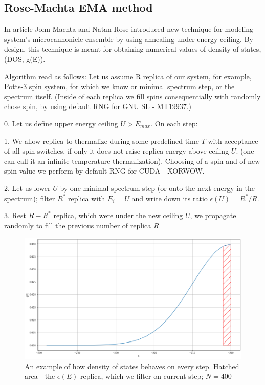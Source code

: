 \documentclass[aps,prl,amssymb,amsmath,twocolumn,floatfix]{revtex4}
\begin{document}
\subsection{Rose-Machta EMA method}

In article \cite{Machta} John Machta and Natan Rose introduced new technique for modeling system's microcannonicle ensemble by using annealing under energy ceiling. By design, this technique is meant for obtaining numerical values of density of states, (DOS, g(E)). 

Algorithm read as follows:
Let us assume R replica of our system, for example, Potts-3 spin system, for which we know or minimal spectrum step, or the spectrum itself. (Inside of each replica we fill spins consequentially with randomly chose spin, by using default RNG for GNU SL - MT19937.)

0. Let us define upper energy ceiling $U > E_{max}$. On each step:

1. We allow replica to thermalize during some predefined time $T$ with acceptance of all spin switches, if only it does not raise replica energy above ceiling $U$. (one can call it an infinite temperature thermalization). Choosing of a spin and of new spin value we perform by default RNG for CUDA - XORWOW.

2. Let us lower $U$ by one minimal spectrum step (or onto the next energy in the spectrum); filter $R^*$ replica with $E_i = U$ and write down its ratio $\epsilon(U) = R^*/R$.

3. Rest $R-R^*$ replica, which were under the new ceiling $U$, we propagate randomly to fill the previous number of replica $R$


\begin{figure}[h!]
	\includegraphics[width=\linewidth]{DOS_slice_picture.png}
	\caption{An example of how density of states behaves on every step. Hatched area - the $\epsilon(E)$ replica, which we filter on current step; $N=400$}
\end{figure}
\end{document}
